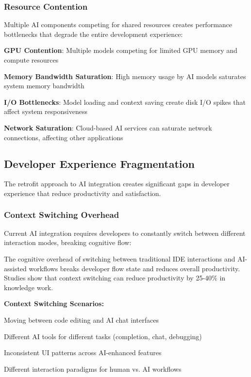 \subsubsection{Resource Contention}

Multiple AI components competing for shared resources creates performance bottlenecks that degrade the entire development experience:

\begin{expandedlist}
    \item \textbf{GPU Contention}: Multiple models competing for limited GPU memory and compute resources
    \item \textbf{Memory Bandwidth Saturation}: High memory usage by AI models saturates system memory bandwidth
    \item \textbf{I/O Bottlenecks}: Model loading and context saving create disk I/O spikes that affect system responsiveness
    \item \textbf{Network Saturation}: Cloud-based AI services can saturate network connections, affecting other applications
\end{expandedlist}

\subsection{Developer Experience Fragmentation}
\label{subsec:developer-experience}

The retrofit approach to AI integration creates significant gaps in developer experience that reduce productivity and satisfaction.

\subsubsection{Context Switching Overhead}

Current AI integration requires developers to constantly switch between different interaction modes, breaking cognitive flow:

\begin{alertbox}
The cognitive overhead of switching between traditional IDE interactions and AI-assisted workflows breaks developer flow state and reduces overall productivity. Studies show that context switching can reduce productivity by 25-40\% in knowledge work.
\end{alertbox}

\textbf{Context Switching Scenarios:}

\begin{description}[leftmargin=3.5cm,labelwidth=3cm]
    \item[\textbf{Mode Switching}] Moving between code editing and AI chat interfaces
    \item[\textbf{Tool Switching}] Different AI tools for different tasks (completion, chat, debugging)
    \item[\textbf{Interface Switching}] Inconsistent UI patterns across AI-enhanced features
    \item[\textbf{Mental Model Switching}] Different interaction paradigms for human vs. AI workflows
\end{description}

